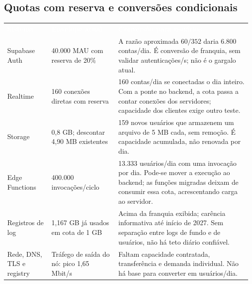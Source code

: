 \documentclass[10pt,a4paper]{article}
\newcommand{\headcell}[1]{\textcolor{white}{\bfseries #1}}
\begin{document}
\subsection{Quotas com reserva e conversões condicionais}
\begingroup\small\renewcommand{\arraystretch}{1.25}
\par\noindent\begin{tabularx}{\linewidth}{@{}L{29mm}L{40mm}Y@{}}
\headcell{Sistema}&\headcell{Envelope atual}&\headcell{Conversão para usuários}\\
Supabase Auth&40.000 MAU com reserva de 20\%&A razão aproximada \(60/352\) daria 6.800 contas/dia. É conversão de franquia, sem validar autenticações/s; não é o gargalo atual.\\
Realtime&160 conexões diretas com reserva&160 contas/dia se conectadas o dia inteiro. Com a ponte no backend, a cota passa a contar conexões dos servidores; capacidade dos clientes exige outro teste.\\
Storage&0,8 GB; descontar 4,90 MB existentes&159 novos usuários que armazenem um arquivo de 5 MB cada, sem remoção. É capacidade acumulada, não renovada por dia.\\
Edge Functions&400.000 invocações/ciclo&13.333 usuários/dia com uma invocação por dia. Pode-se mover a execução ao backend; as funções migradas deixam de consumir essa cota, acrescentando carga ao servidor.\\
Registros de log&1,167 GB já usados em cota de 1 GB&Acima da franquia exibida; carência informativa até início de 2027. Sem separação entre logs de fundo e de usuários, não há teto diário confiável.\\
Rede, DNS, TLS e registry&Tráfego de saída do nó: pico 1,65 Mbit/s&Faltam capacidade contratada, transferência e demanda individual. Não há base para converter em usuários/dia.\\
\end{tabularx}\endgroup
\end{document}
